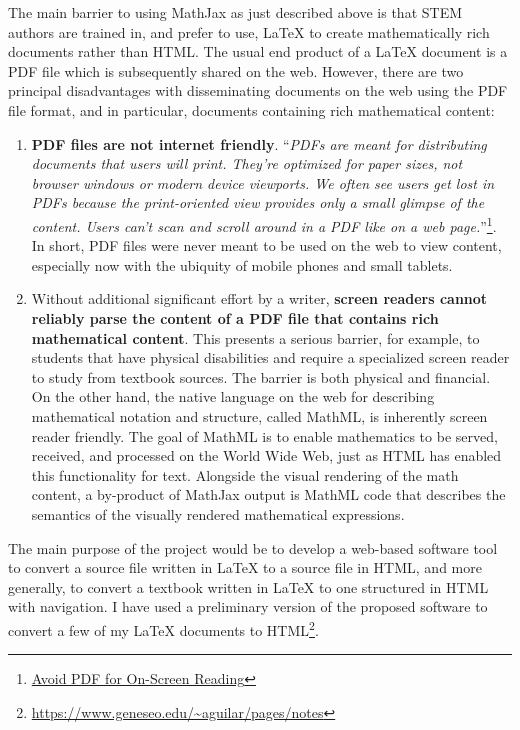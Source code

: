 \documentclass[12pt]{article}
\begin{document}
The main barrier to using MathJax as just described above is that STEM authors are trained in, and prefer to use, LaTeX to create mathematically rich documents rather than HTML.  The usual end product of a LaTeX document is a PDF file which is subsequently shared on the web.  However, there are two principal disadvantages with disseminating documents on the web using the PDF file format, and in particular, documents containing rich mathematical content:
\begin{enumerate}
\item \textbf{PDF files are not internet friendly}.  ``\textit{PDFs are meant for distributing documents that users will print. They're optimized for paper sizes, not browser windows or modern device viewports. We often see users get lost in PDFs because the print-oriented view provides only a small glimpse of the content. Users can't scan and scroll around in a PDF like on a web page.}''\footnote{\href{https://www.nngroup.com/articles/avoid-pdf-for-on-screen-reading/}{Avoid PDF for On-Screen Reading}}. In short, PDF files were never meant to be used on the web to view content, especially now with the ubiquity of mobile phones and small tablets.

\item Without additional significant effort by a writer, \textbf{screen readers cannot reliably parse the content of a PDF file that contains rich mathematical content}.  This presents a serious barrier, for example, to students that have physical disabilities and require a specialized screen reader to study from textbook sources.  The barrier is both physical and financial.  On the other hand, the native language on the web for describing mathematical notation and structure, called MathML, is inherently screen reader friendly.  The goal of MathML is to enable mathematics to be served, received, and processed on the World Wide Web, just as HTML has enabled this functionality for text.  Alongside the visual rendering of the math content, a by-product of MathJax output is MathML code that describes the semantics of the visually rendered mathematical expressions.
\end{enumerate}

The main purpose of the project would be to develop a web-based software tool to convert a source file written in LaTeX to a source file in HTML, and more generally, to convert a textbook written in LaTeX to one structured in HTML with navigation.  I have used a preliminary version of the proposed software to convert a few of my LaTeX documents to HTML\footnote{\href{https://www.geneseo.edu/~aguilar/pages/notes}{https://www.geneseo.edu/\~{}aguilar/pages/notes}}.
\end{document}
